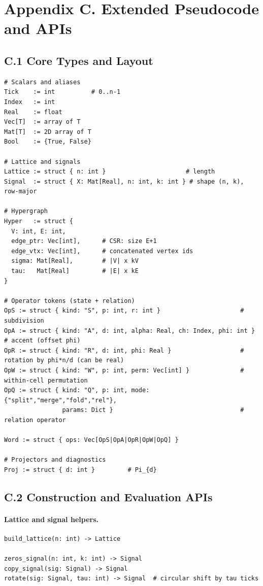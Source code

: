 \documentclass[12pt]{article}
\numberwithin{equation}{section}
\theoremstyle{plain}
\theoremstyle{definition}
\theoremstyle{remark}
\begin{document}
\section*{Appendix C. Extended Pseudocode and APIs}

\subsection*{C.1 Core Types and Layout}
\begin{verbatim}
# Scalars and aliases
Tick    := int          # 0..n-1
Index   := int
Real    := float
Vec[T]  := array of T
Mat[T]  := 2D array of T
Bool    := {True, False}

# Lattice and signals
Lattice := struct { n: int }                      # length
Signal  := struct { X: Mat[Real], n: int, k: int } # shape (n, k), row-major

# Hypergraph
Hyper   := struct {
  V: int, E: int,
  edge_ptr: Vec[int],      # CSR: size E+1
  edge_vtx: Vec[int],      # concatenated vertex ids
  sigma: Mat[Real],        # |V| x kV
  tau:   Mat[Real]         # |E| x kE
}

# Operator tokens (state + relation)
OpS := struct { kind: "S", p: int, r: int }                      # subdivision
OpA := struct { kind: "A", d: int, alpha: Real, ch: Index, phi: int } # accent (offset phi)
OpR := struct { kind: "R", d: int, phi: Real }                   # rotation by phi*n/d (can be real)
OpW := struct { kind: "W", p: int, perm: Vec[int] }              # within-cell permutation
OpQ := struct { kind: "Q", p: int, mode: {"split","merge","fold","rel"},
                params: Dict }                                   # relation operator

Word := struct { ops: Vec[OpS|OpA|OpR|OpW|OpQ] }

# Projectors and diagnostics
Proj := struct { d: int }         # Pi_{d}
\end{verbatim}

\subsection*{C.2 Construction and Evaluation APIs}
\paragraph{Lattice and signal helpers.}
\begin{verbatim}
build_lattice(n: int) -> Lattice

zeros_signal(n: int, k: int) -> Signal
copy_signal(sig: Signal) -> Signal
rotate(sig: Signal, tau: int) -> Signal  # circular shift by tau ticks
\end{verbatim}
\end{document}
